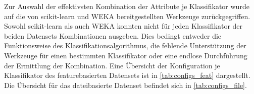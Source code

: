 Zur Auswahl der effektivsten Kombination der Attribute je Klassifikator wurde auf die von scikit-learn und WEKA bereitgestellten Werkzeuge zurückgegriffen. Sowohl scikit-learn als auch WEKA konnten nicht für jeden Klassifikator der beiden Datensets Kombinationen ausgeben. Dies bedingt entweder die Funktionsweise des Klassifikationsalgorithmus, die fehlende Unterstützung der Werkzeuge für einen bestimmten Klassifikator oder eine endlose Durchführung der Ermittlung der Kombination. Eine Übersicht der Konfiguration je Klassifikator des featurebasierten Datensets ist in \autoref{tab:configs_feat} dargestellt. Die Übersicht für das dateibasierte Datenset befindet sich in \autoref{tab:configs_file}.

\begin{table}[t]
\centering
\caption{Übersicht der Konfigurationen des featurebasierten Datensets}
\label{tab:configs_feat}
\end{table}
